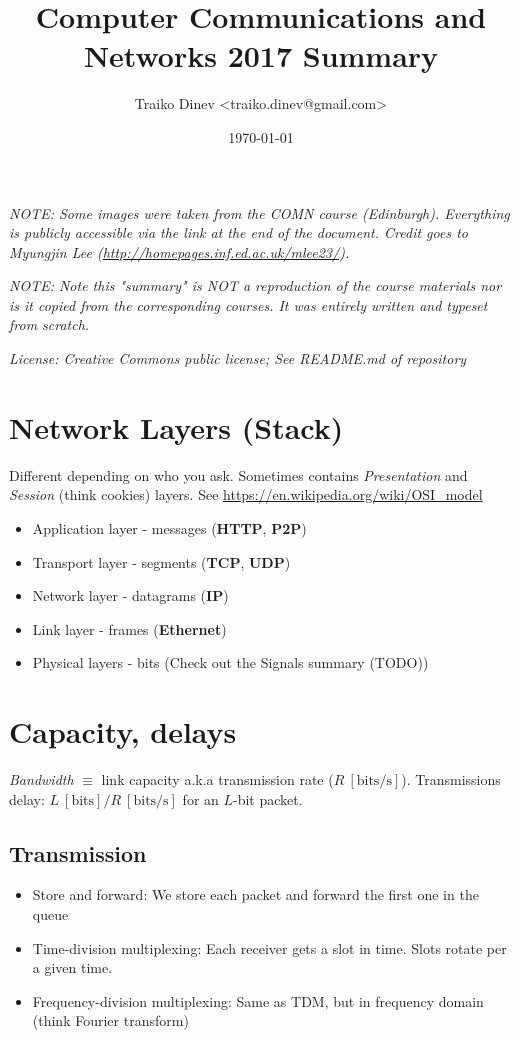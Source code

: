 \documentclass{article}
\title{Computer Communications and Networks 2017 Summary}
\date{\today}
\author{Traiko Dinev \textless traiko.dinev@gmail.com\textgreater}
\begin{document}
\maketitle

\textit{NOTE: Some images were taken from the COMN course (Edinburgh). Everything is publicly accessible via the link at the end of the document. Credit goes to Myungjin Lee (\url{http://homepages.inf.ed.ac.uk/mlee23/}).}

\textit{NOTE: Note this "summary" is NOT a reproduction of the course materials nor is it copied from the corresponding courses. It was entirely written and typeset from scratch.}

\textit{License: Creative Commons public license; See README.md of repository}

\section{Network Layers (Stack)}
Different depending on who you ask. Sometimes contains \textit{Presentation} and \textit{Session} (think cookies) layers. See \url{https://en.wikipedia.org/wiki/OSI_model}

\begin{itemize}
    \item Application layer - messages (\textbf{HTTP}, \textbf{P2P})
    \item Transport layer - segments (\textbf{TCP}, \textbf{UDP})
    \item Network layer - datagrams (\textbf{IP})
    \item Link layer - frames (\textbf{Ethernet})
    \item Physical layers - bits (Check out the Signals summary (TODO))
\end{itemize}

\section{Capacity, delays}

\textit{Bandwidth} $\equiv$ link capacity a.k.a transmission rate ($R\ [\text{bits/s}]$).
Transmissions delay: $L\ [\text{bits}] / R\ [\text{bits/s}]$ for an $L$-bit packet.

\subsection{Transmission}
\begin{itemize}
    \item Store and forward: We store each packet and forward the first one in the queue
    \item Time-division multiplexing: Each receiver gets a slot in time. Slots rotate per a given time.
    \item Frequency-division multiplexing: Same as TDM, but in frequency domain (think Fourier transform)
\end{itemize}
\end{document}
